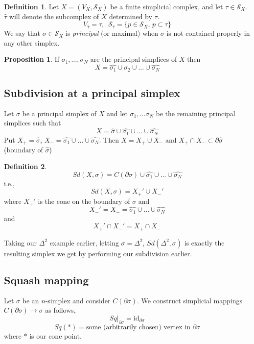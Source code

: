 \documentclass[a4paper,14pt]{extarticle}
\theoremstyle{definition}
\newtheorem*{definition}{Definition}
\newtheorem*{proposition}{Proposition}
\begin{document}
\begin{definition}
	Let $X=(V_X,\mathcal{S}_X)$ be a finite simplicial complex, and let $\tau\in\mathcal{S}_X$.
	$\hat{\tau}$ will denote the subcomplex of $X$ determined by $\tau$.
	\[V_{\hat{\tau}}=\tau, \,\,\,\mathcal{S}_{\hat{\tau}}=\{p\in\mathcal{S}_X, \,p\subset\tau\}\]
	We say that $\sigma\in\mathcal{S}_X$ is \emph{principal} (or maximal) when $\sigma$ is not
	contained properly in any other simplex.
\end{definition}

\begin{proposition}
	If $\sigma_1,\ldots,\sigma_N$ are the principal simplices of $X$ then 
	\[X=\hat{\sigma_1}\cup\hat{\sigma_2}\cup\ldots\cup\hat{\sigma_N}\]
\end{proposition}

\subsection{Subdivision at a principal simplex}
Let $\sigma$ be a principal simplex of $X$ and let $\sigma_1,\ldots\sigma_N$ be the remaining
principal simplices such that \[X=\hat{\sigma}\cup\hat{\sigma_1}\cup\ldots\cup\hat{\sigma_N}\]
Put $X_+=\hat{\sigma}$, $X_-=\hat{\sigma_1}\cup\ldots\cup\hat{\sigma_N}$. Then 
$X=X_+\cup X_-$ and $X_+\cap X_-\subset\partial\hat{\sigma}$ (boundary of $\hat{\sigma}$)

\begin{definition}
	\[Sd(X,\sigma)=C(\partial\sigma)\cup\hat{\sigma_1}\cup\ldots\cup\hat{\sigma_N}\] i.e.,
	\[Sd(X,\sigma)=X_+'\cup X_-'\] where $X_+'$ is the cone on the boundary of $\sigma$ and
	\[X_-'=X_-=\hat{\sigma_1}\cup\ldots\cup\hat{\sigma_N}\] and \[X_+'\cap X_-'=X_+\cap X_-\]
\end{definition}

Taking our $\Delta^2$ example earlier, letting $\sigma=\Delta^2$, $Sd(\Delta^2,\sigma)$ is 
exactly the resulting simplex we get by performing our subdivision earlier.

\subsection{Squash mapping}
Let $\sigma$ be an $n$-simplex and consider $C(\partial\sigma)$. We construct simplicial mappings
$C(\partial\sigma)\rightarrow\sigma$ as follows,
\[Sq|_{\partial\sigma}=\text{id}_{\partial\sigma}\] \[Sq(*)=\text{some (arbitrarily chosen)
vertex in }\partial\sigma\] where $*$ is our cone point.
\end{document}
